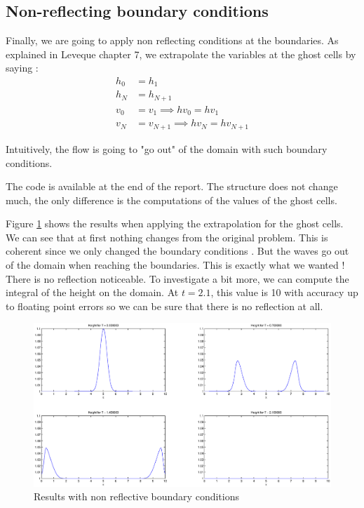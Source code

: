 \subsection{Non-reflecting boundary conditions}
Finally, we are going to apply non reflecting conditions at the boundaries. As explained in Leveque chapter 7, we extrapolate the variables at the ghost cells by saying :
\begin{align*}
h_0 &= h_1\\
h_N &= h_{N+1}\\
v_0 &= v_1 \implies hv_0 = hv_1\\
v_N &= v_{N+1} \implies hv_N = hv_{N+1}
\end{align*}

Intuitively, the flow is going to "go out" of the domain with such boundary conditions.

The code is available at the end of the report. The structure does not change much, the only difference is the computations of the values of the ghost cells.

Figure \ref{noRe} shows the results when applying the extrapolation for the ghost cells. We can see that at first nothing changes from the original problem. This is coherent since we only changed the boundary conditions . But the waves go out of the domain when reaching the boundaries. This is exactly what we wanted ! There is no reflection noticeable. To investigate a bit more, we can compute the integral of the height on the domain. At $t=2.1$, this value is 10 with accuracy up to floating point errors so we can be sure that there is no reflection at all.

\begin{figure}
\begin{center}
\includegraphics[scale=0.4]{noRe.eps}
\caption{Results with non reflective boundary conditions}
\label{noRe}
\end{center}
\end{figure} 